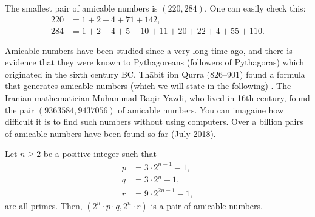 \documentclass[12pt]{subfile}
\begin{document}
	\begin{example}
		The smallest pair of amicable numbers is $(220,284)$. One can easily check this:
		\begin{align*}
			220 &= 1 + 2 +  4 + 71 + 142,\\
			284 &= 1 + 2 + 4 + 5 + 10 + 11 + 20 + 22 + 4 + 55 + 110.
		\end{align*}
	\end{example}
	
	Amicable numbers have been studied since a very long time ago, and there is evidence that they were known to Pythagoreans (followers of Pythagoras) which originated in the sixth century BC. Th\={a}bit ibn Qurra (826--901) found a formula that generates amicable numbers (which we will state in the following) \cite{ch:arithfunc-dickson}. The Iranian mathematician Muhammad Baqir Yazdi, who lived in 16th century, found the pair $(9363584, 9437056)$ of amicable numbers. You can imagaine how difficult it is to find such numbers without using computers. Over a billion pairs of amicable numbers have been found so far (July 2018).
	
	\begin{theorem}[Th\={a}bit ibn Qurra's Rule]
		Let $n\geq 2$ be a positive integer such that
		\begin{align*}
			p & = 3 \cdot 2^{n-1} - 1,\\
			q & = 3 \cdot 2^{n} - 1,\\
			r & = 9 \cdot 2^{2n - 1} - 1,
		\end{align*}
		are all primes. Then, $(2^n\cdot p \cdot q,  2^n\cdot r)$ is a pair of amicable numbers. 
	\end{theorem}
	
\end{document}
